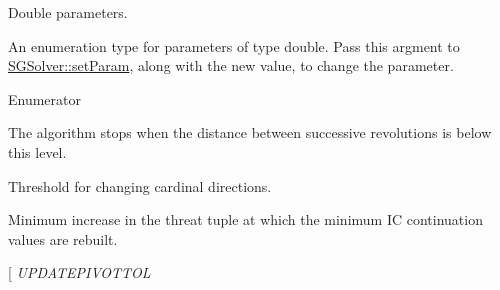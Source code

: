 Double parameters. 

An enumeration type for parameters of type double. Pass this argment to \hyperlink{class_s_g_solver_a7810a9f3d48d3eb7220154274dd39053}{S\+G\+Solver\+::set\+Param}, along with the new value, to change the parameter. \begin{Desc}
\item[Enumerator]\par
\begin{description}
\item[{\em 
\hypertarget{class_s_g_solver_a8c5a3d3ffb0b8344e24da63ea0b3e791aa95cd65c0e0c61f23336299c31c21e23}{E\+R\+R\+O\+R\+T\+O\+L}\label{class_s_g_solver_a8c5a3d3ffb0b8344e24da63ea0b3e791aa95cd65c0e0c61f23336299c31c21e23}
}]The algorithm stops when the distance between successive revolutions is below this level. \item[{\em 
\hypertarget{class_s_g_solver_a8c5a3d3ffb0b8344e24da63ea0b3e791afb966ddafded880b3a150ffbf665c0b9}{D\+I\+R\+E\+C\+T\+I\+O\+N\+T\+O\+L}\label{class_s_g_solver_a8c5a3d3ffb0b8344e24da63ea0b3e791afb966ddafded880b3a150ffbf665c0b9}
}]Threshold for changing cardinal directions. \item[{\em 
\hypertarget{class_s_g_solver_a8c5a3d3ffb0b8344e24da63ea0b3e791a0bf9e7be2aa199b09eb7fcfb5a604e84}{P\+A\+S\+T\+T\+H\+R\+E\+A\+T\+T\+O\+L}\label{class_s_g_solver_a8c5a3d3ffb0b8344e24da63ea0b3e791a0bf9e7be2aa199b09eb7fcfb5a604e84}
}]Minimum increase in the threat tuple at which the minimum I\+C continuation values are rebuilt. \item[{\em 
\hypertarget{class_s_g_solver_a8c5a3d3ffb0b8344e24da63ea0b3e791a26c3df797839d75535ea3525159c9687}{U\+P\+D\+A\+T\+E\+P\+I\+V\+O\+T\+T\+O\+L}\label{class_s_g_solver_a8c5a3d3ffb0b8344e24da63ea0b3e791a26c3df797839d75535ea3525159c9687}
}
\end{description}
\end{Desc}
